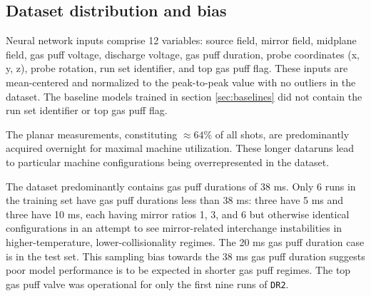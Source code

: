 
%

\subsection{Dataset distribution and bias}

Neural network inputs comprise 12 variables: source field, mirror field, midplane field, gas puff voltage, discharge voltage, gas puff duration, probe coordinates (x, y, z), probe rotation, run set identifier, and top gas puff flag. These inputs are mean-centered and normalized to the peak-to-peak value with no outliers in the dataset. The baseline models trained in section \ref{sec:baselines} did not contain the run set identifier or top gas puff flag.

The planar measurements, constituting $\approx 64\%$ of all shots, are predominantly acquired overnight for maximal machine utilization. These longer dataruns lead to particular machine configurations being overrepresented in the dataset. 

The dataset predominantly contains gas puff durations of 38 ms. Only 6 runs in the training set have gas puff durations less than 38 ms: three have 5 ms and three have 10 ms, each having mirror ratios 1, 3, and 6 but otherwise identical configurations in an attempt to see mirror-related interchange instabilities in higher-temperature, lower-collisionality regimes. The 20 ms gas puff duration case is in the test set. This sampling bias towards the 38 ms gas puff duration suggests poor model performance is to be expected in shorter gas puff regimes. The top gas puff valve was operational for only the first nine runs of \texttt{DR2}.

